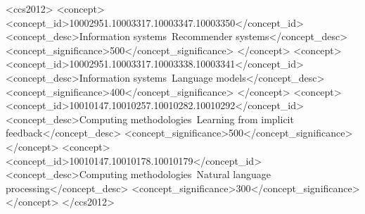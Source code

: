 \documentclass[sigconf,nonacm]{acmart}
\begin{document}
\begin{CCSXML}
<ccs2012>
   <concept>
       <concept_id>10002951.10003317.10003347.10003350</concept_id>
       <concept_desc>Information systems~Recommender systems</concept_desc>
       <concept_significance>500</concept_significance>
       </concept>
   <concept>
       <concept_id>10002951.10003317.10003338.10003341</concept_id>
       <concept_desc>Information systems~Language models</concept_desc>
       <concept_significance>400</concept_significance>
       </concept>
   <concept>
       <concept_id>10010147.10010257.10010282.10010292</concept_id>
       <concept_desc>Computing methodologies~Learning from implicit feedback</concept_desc>
       <concept_significance>500</concept_significance>
       </concept>
   <concept>
       <concept_id>10010147.10010178.10010179</concept_id>
       <concept_desc>Computing methodologies~Natural language processing</concept_desc>
       <concept_significance>300</concept_significance>
       </concept>
 </ccs2012>
\end{CCSXML}



\maketitle














\appendix

\end{document}
